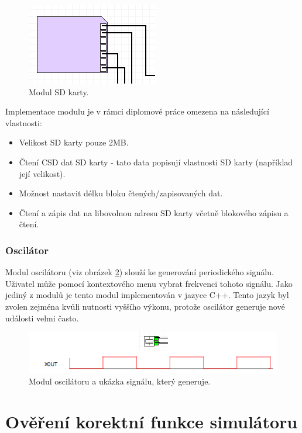 \begin{figure}[ht]
\centering
\includegraphics[trim=0cm 0cm 0cm 0cm, scale=1]{fig/sd}
\caption{Modul SD karty.}
\label{fig:sd}
\end{figure}

Implementace modulu je v rámci diplomové práce omezena na následující vlastnosti:

\begin{itemize}
\item Velikost SD karty pouze 2MB.
\item Čtení CSD dat SD karty - tato data popisují vlastnosti SD karty (například její velikost).
\item Možnost nastavit délku bloku čtených/zapisovaných dat.
\item Čtení a zápis dat na libovolnou adresu SD karty včetně blokového zápisu a čtení.
\end{itemize}

\subsection{Oscilátor}

Modul oscilátoru (viz obrázek \ref{fig:oscilator}) slouží ke generování periodického signálu. Uživatel může pomocí kontextového menu vybrat frekvenci tohoto signálu. Jako jediný z modulů je tento modul implementován v jazyce C++. Tento jazyk byl zvolen zejména kvůli nutnosti vyššího výkonu, protože oscilátor generuje nové události velmi často.

\begin{figure}[ht]
\centering
\includegraphics[trim=0cm 0cm 0cm 0cm, scale=0.8]{fig/oscilator}
\caption{Modul oscilátoru a ukázka signálu, který generuje.}
\label{fig:oscilator}
\end{figure}

\chapter{Ověření korektní funkce simulátoru}


